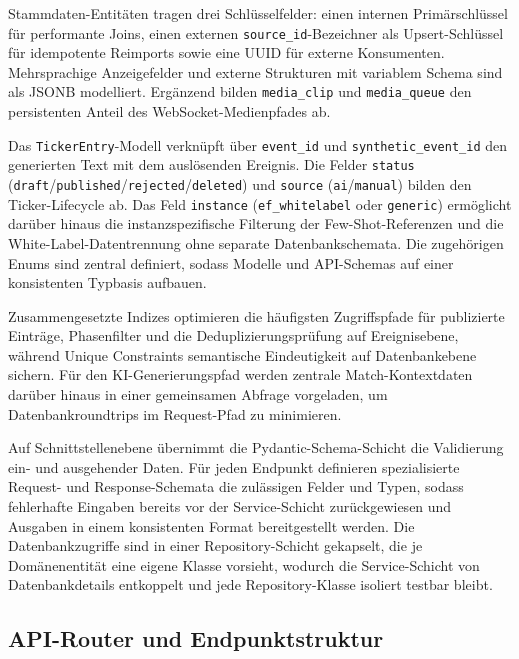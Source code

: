 Stammdaten-Entitäten tragen drei Schlüsselfelder: einen internen Primärschlüssel für performante Joins, einen externen \texttt{source\_id}-Bezeichner als Upsert-Schlüssel für idempotente Reimports sowie eine UUID für externe Konsumenten. Mehrsprachige Anzeigefelder und externe Strukturen mit variablem Schema sind als JSONB modelliert. Ergänzend bilden \texttt{media\_clip} und \texttt{media\_queue} den persistenten Anteil des WebSocket-Medienpfades ab.

Das \texttt{TickerEntry}-Modell verknüpft über \texttt{event\_id} und \texttt{synthetic\_event\_id} den generierten Text mit dem auslösenden Ereignis. Die Felder \texttt{status} (\texttt{draft}/\allowbreak\texttt{published}/\allowbreak\texttt{rejected}/\allowbreak\texttt{deleted}) und \texttt{source} (\texttt{ai}/\texttt{manual}) bilden den Ticker-Lifecycle ab. Das Feld \texttt{instance} (\texttt{ef\_whitelabel} oder \texttt{generic}) ermöglicht darüber hinaus die instanzspezifische Filterung der Few-Shot-Referenzen und die White-Label-Datentrennung ohne separate Datenbankschemata. Die zugehörigen Enums sind zentral definiert, sodass Modelle und API-Schemas auf einer konsistenten Typbasis aufbauen.

Zusammengesetzte Indizes optimieren die häufigsten Zugriffspfade für publizierte Einträge, Phasenfilter und die Deduplizierungsprüfung auf Ereignisebene, während Unique Constraints semantische Eindeutigkeit auf Datenbankebene sichern. Für den KI-Generierungspfad werden zentrale Match-Kontextdaten darüber hinaus in einer gemeinsamen Abfrage vorgeladen, um Datenbankroundtrips im Request-Pfad zu minimieren.

Auf Schnittstellenebene übernimmt die Pydantic-Schema-Schicht die Validierung ein- und ausgehender Daten. Für jeden Endpunkt definieren spezialisierte Request- und Response-Schemata die zulässigen Felder und Typen, sodass fehlerhafte Eingaben bereits vor der Service-Schicht zurückgewiesen und Ausgaben in einem konsistenten Format bereitgestellt werden. Die Datenbankzugriffe sind in einer Repository-Schicht gekapselt, die je Domänenentität eine eigene Klasse vorsieht, wodurch die Service-Schicht von Datenbankdetails entkoppelt und jede Repository-Klasse isoliert testbar bleibt.

\subsection{API-Router und Endpunktstruktur}\label{api-router-endpunktstruktur}

